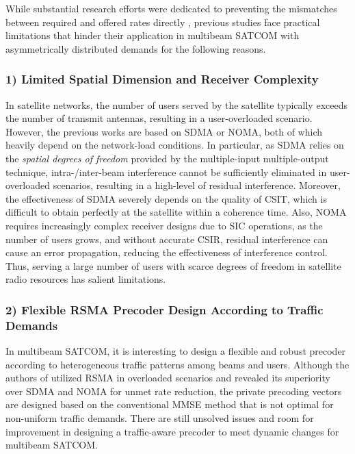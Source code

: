 \documentclass[draftclsnofoot, onecolumn, comsoc, 12pt]{IEEEtran}
\begin{document}
{ 
While substantial research efforts were dedicated to preventing the mismatches between required and offered rates directly \cite{wang2020noma, lin2022multi, zheng2012generic, liu2019qos, 9769901, cui2023energy}, previous studies face practical limitations that hinder their application in multibeam SATCOM with asymmetrically distributed demands for the following reasons.
\subsubsection*{\rm{1) Limited Spatial Dimension and Receiver Complexity}} In satellite networks, the number of users served by the satellite typically exceeds the number of transmit antennas, resulting in a user-overloaded scenario. However,
the previous works \cite{wang2020noma, lin2022multi, zheng2012generic, liu2019qos, 9769901} are based on SDMA or NOMA, both of which heavily depend on the network-load conditions.
In particular, as SDMA relies on the \textit{spatial degrees of freedom} provided by the multiple-input multiple-output technique, intra-/inter-beam interference cannot be sufficiently eliminated in user-overloaded scenarios, resulting in a high-level of residual interference. Moreover, the effectiveness of SDMA severely depends on the quality of CSIT, which is difficult to obtain perfectly at the satellite within a coherence time.
Also, NOMA requires increasingly complex receiver designs
due to SIC operations, as the number of users grows, and
without accurate CSIR, residual interference can cause an error propagation, reducing the effectiveness of interference control.
Thus, serving a large number of users with scarce degrees of
freedom in satellite radio resources has salient limitations.




\subsubsection*{\rm{2) Flexible RSMA Precoder Design According to Traffic Demands}}
In multibeam SATCOM, it is interesting to design a flexible and robust precoder according to heterogeneous traffic patterns among beams and users.
Although the authors of \cite{cui2023energy} utilized RSMA in overloaded scenarios and revealed its superiority over SDMA and NOMA for unmet rate reduction, the private precoding vectors are designed based on the conventional MMSE method that is not optimal for non-uniform traffic demands. There are still unsolved issues and room for improvement in designing a traffic-aware precoder to meet dynamic changes for multibeam SATCOM.

}
\end{document}
